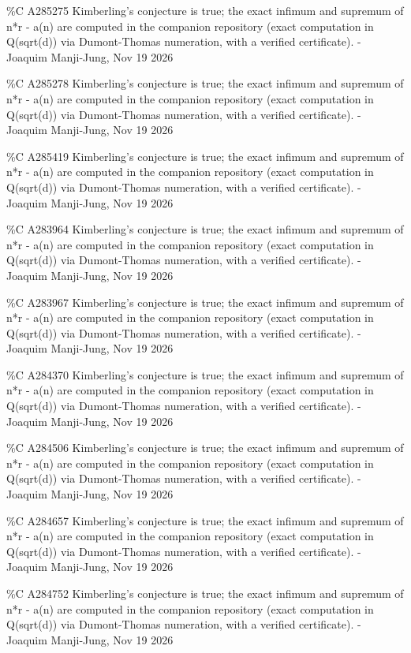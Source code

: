 {\%C A285275 Kimberling's conjecture is true; the exact infimum and supremum of n*r - a(n) are computed in the companion repository (exact computation in Q(sqrt(d)) via Dumont-Thomas numeration, with a verified certificate). - Joaquim Manji-Jung, Nov 19 2026\par
\%C A285278 Kimberling's conjecture is true; the exact infimum and supremum of n*r - a(n) are computed in the companion repository (exact computation in Q(sqrt(d)) via Dumont-Thomas numeration, with a verified certificate). - Joaquim Manji-Jung, Nov 19 2026\par
\%C A285419 Kimberling's conjecture is true; the exact infimum and supremum of n*r - a(n) are computed in the companion repository (exact computation in Q(sqrt(d)) via Dumont-Thomas numeration, with a verified certificate). - Joaquim Manji-Jung, Nov 19 2026\par
\%C A283964 Kimberling's conjecture is true; the exact infimum and supremum of n*r - a(n) are computed in the companion repository (exact computation in Q(sqrt(d)) via Dumont-Thomas numeration, with a verified certificate). - Joaquim Manji-Jung, Nov 19 2026\par
\%C A283967 Kimberling's conjecture is true; the exact infimum and supremum of n*r - a(n) are computed in the companion repository (exact computation in Q(sqrt(d)) via Dumont-Thomas numeration, with a verified certificate). - Joaquim Manji-Jung, Nov 19 2026\par
\%C A284370 Kimberling's conjecture is true; the exact infimum and supremum of n*r - a(n) are computed in the companion repository (exact computation in Q(sqrt(d)) via Dumont-Thomas numeration, with a verified certificate). - Joaquim Manji-Jung, Nov 19 2026\par
\%C A284506 Kimberling's conjecture is true; the exact infimum and supremum of n*r - a(n) are computed in the companion repository (exact computation in Q(sqrt(d)) via Dumont-Thomas numeration, with a verified certificate). - Joaquim Manji-Jung, Nov 19 2026\par
\%C A284657 Kimberling's conjecture is true; the exact infimum and supremum of n*r - a(n) are computed in the companion repository (exact computation in Q(sqrt(d)) via Dumont-Thomas numeration, with a verified certificate). - Joaquim Manji-Jung, Nov 19 2026\par
\%C A284752 Kimberling's conjecture is true; the exact infimum and supremum of n*r - a(n) are computed in the companion repository (exact computation in Q(sqrt(d)) via Dumont-Thomas numeration, with a verified certificate). - Joaquim Manji-Jung, Nov 19 2026\par
}
